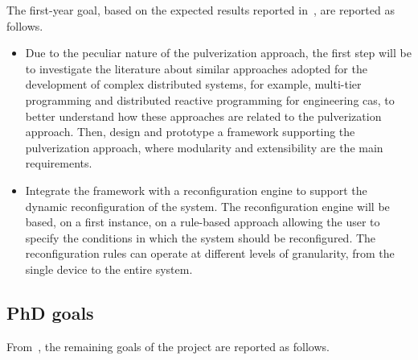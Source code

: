 \documentclass[12pt]{article}
\begin{document}
The first-year goal,
based on the expected results reported in~,
are reported as follows.

\begin{itemize}
	\item Due to the peculiar nature of the pulverization approach,
		the first step will be to investigate the literature about similar approaches adopted for the development of complex distributed systems,
		for example, multi-tier programming and distributed reactive programming for engineering \ac{cas},
		to better understand how these approaches are related to the pulverization approach.
		Then, design and prototype a framework supporting the pulverization approach,
		where modularity and extensibility are the main requirements.
	\item Integrate the framework with a reconfiguration engine to support the dynamic reconfiguration of the system.
	    The reconfiguration engine will be based,
		on a first instance,
		on a rule-based approach allowing the user to specify the conditions in which the system should be reconfigured.
	    The reconfiguration rules can operate at different levels of granularity,
	    from the single device to the entire system.
\end{itemize}

\subsection{PhD goals}\label{subsec:phd-activities}

From~,
the remaining goals of the project are reported as follows.
\end{document}
